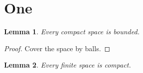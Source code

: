 \documentclass{article}
\newtheorem{lem}{Lemma}[section]
\def\lbl#1{ \label{#1}}
\def\>{\end}
\def\lemm#1{ \begin{lem} \lbl{#1} }
\def\prf{\begin{proof}}
\begin{document}
\section{One}
\lemm{a}
Every compact space is bounded.
\>{lem}
\prf
Cover the space by balls.
\end{proof}
\begin{lem}\label{b} Every finite space is compact. \end{lem}
\end{document}
